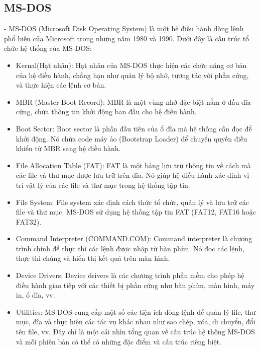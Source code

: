 \documentclass[12pt,a4paper]{article}
\begin{document}
\subsection{MS-DOS}
- MS-DOS (Microsoft Disk Operating System) là một hệ điều hành dòng lệnh phổ biến của Microsoft trong những năm 1980 và 1990. Dưới đây là cấu trúc tổ chức hệ thống của MS-DOS: 
\begin{itemize}
	\item Kernal(Hạt nhân): Hạt nhân của MS-DOS thực hiện các chức năng cơ bản của hệ điều hành, chẳng hạn như quản lý bộ nhớ, tương tác với phần cứng, và thực hiện các lệnh cơ bản.
	\item MBR (Master Boot Record): MBR là một vùng nhớ đặc biệt nằm ở đầu đĩa cứng, chứa thông tin khởi động ban đầu cho hệ điều hành.
	\item Boot Sector: Boot sector là phần đầu tiên của ổ đĩa mà hệ thống cần đọc để khởi động. Nó chứa code máy ảo (Bootstrap Loader) để chuyển quyền điều khiển từ MBR sang hệ điều hành.
	\item File Allocation Table (FAT): FAT là một bảng lưu trữ thông tin về cách mà các file và thư mục được lưu trữ trên đĩa. Nó giúp hệ điều hành xác định vị trí vật lý của các file và thư mục trong hệ thống tập tin.
	\item File System: File system xác định cách thức tổ chức, quản lý và lưu trữ các file và thư mục. MS-DOS sử dụng hệ thống tập tin FAT (FAT12, FAT16 hoặc FAT32).
	\item Command Interpreter (COMMAND.COM): Command interpreter là chương trình chính để thực thi các lệnh được nhập từ bàn phím. Nó đọc các lệnh, thực thi chúng và hiển thị kết quả trên màn hình.
	\item Device Drivers: Device drivers là các chương trình phần mềm cho phép hệ điều hành giao tiếp với các thiết bị phần cứng như bàn phím, màn hình, máy in, ổ đĩa, vv.
	\item Utilities: MS-DOS cung cấp một số các tiện ích dòng lệnh để quản lý file, thư mục, đĩa và thực hiện các tác vụ khác nhau như sao chép, xóa, di chuyển, đổi tên file, vv. Đây chỉ là một cái nhìn tổng quan về cấu trúc hệ thống MS-DOS và mỗi phiên bản có thể có những đặc điểm và cấu trúc riêng biệt.
\end{itemize}
\end{document}
